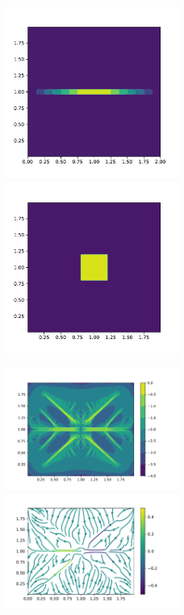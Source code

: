 \documentclass[letterpaper,12pt]{article}
\theoremstyle{plain}
\theoremstyle{remark}
\theoremstyle{remark}
\theoremstyle{remark}
\numberwithin{equation}{section}
\begin{document}
\begin{figure}
  \includegraphics[width=0.5\textwidth]{2/m1}
  \includegraphics[width=0.5\textwidth]{2/s}
\end{figure}
\begin{figure}
  \includegraphics[width=0.5\textwidth]{2/PCG}
  \includegraphics[width=0.5\textwidth]{2/vector}
\end{figure}
\end{document}
